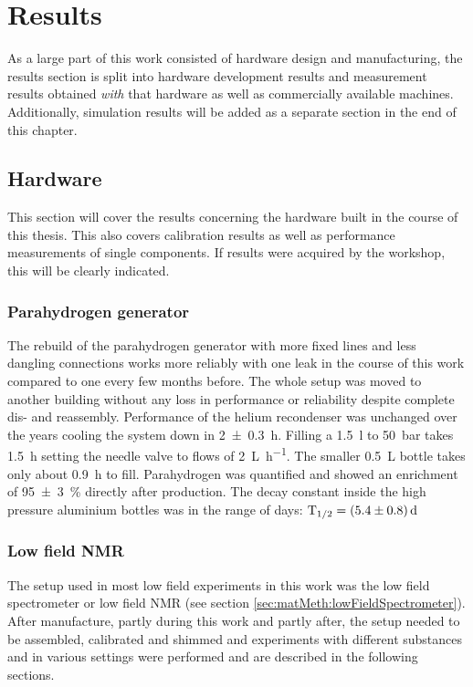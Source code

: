 \chapter{Results}\label{chap:results}
    As a large part of this work consisted of hardware design and manufacturing, the results section is split into hardware development results and measurement results obtained \textit{with} that hardware as well as commercially available machines. Additionally, simulation results will be added as a separate section in the end of this chapter.
\section{Hardware}
    This section will cover the results concerning the hardware built in the course of this thesis. This also covers calibration results as well as performance measurements of single components. If results were acquired by the workshop, this will be clearly indicated.
    \subsection{Parahydrogen generator}
        The rebuild of the parahydrogen generator with more fixed lines and less dangling connections works more reliably with one leak in the course of this work compared to one every few months before. The whole setup was moved to another building without any loss in performance or reliability despite complete dis- and reassembly.
        Performance of the helium recondenser was unchanged over the years cooling the system down in \SI{2\pm0.3}{\hour}. Filling a \SI{1.5}{\l} to \SI{50}{\bar} takes \SI{1.5}{\hour} setting the needle valve to flows of \SI{2}{\liter\per\hour}. The smaller \SI{0.5}{\liter} bottle takes only about \SI{0.9}{\hour} to fill.
        Parahydrogen was quantified and showed an enrichment of \SI{95\pm3}{\%} directly after production. The decay constant inside the high pressure aluminium bottles was in the range of days: $\mathrm{T}_{1/2} = \SI{5.4\pm 0.8}{\day}$
    \subsection{Low field NMR}
    The setup used in most low field experiments in this work was the low field spectrometer or low field NMR (see section \ref{sec:matMeth:lowFieldSpectrometer}). After manufacture, partly during this work and partly after, the setup needed to be assembled, calibrated and shimmed and experiments with different substances and in various settings were performed and are described in the following sections.
